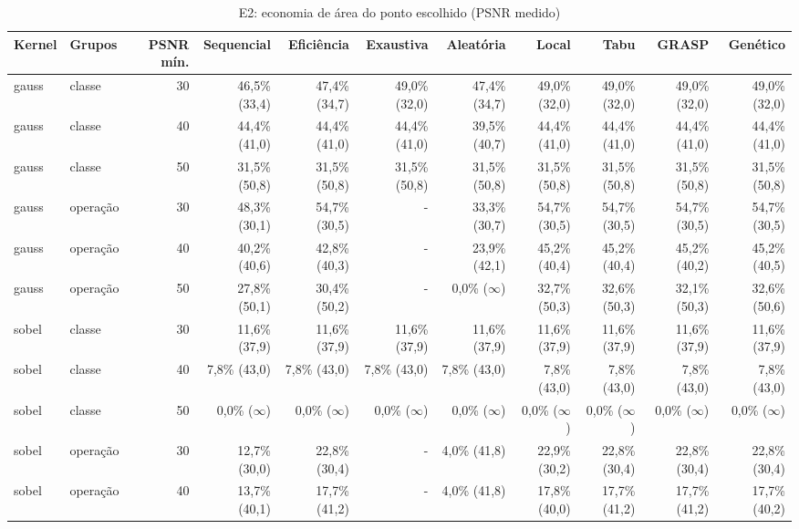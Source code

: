 \begin{table}[htbp]
\centering
\caption{E2: economia de área do ponto escolhido (PSNR medido)}
\begin{tabular}{|l|l|r|r|r|r|r|r|r|r|r|}
\hline
\rowcolor{tabAzul}\color{white}Kernel & \color{white}Grupos & \color{white}PSNR mín. & \color{white}Sequencial & \color{white}Eficiência & \color{white}Exaustiva & \color{white}Aleatória & \color{white}Local & \color{white}Tabu & \color{white}GRASP & \color{white}Genético \\
\hline
gauss & classe & 30 & 46,5\% (33,4) & 47,4\% (34,7) & 49,0\% (32,0) & 47,4\% (34,7) & 49,0\% (32,0) & 49,0\% (32,0) & 49,0\% (32,0) & 49,0\% (32,0) \\ \hline
gauss & classe & 40 & 44,4\% (41,0) & 44,4\% (41,0) & 44,4\% (41,0) & 39,5\% (40,7) & 44,4\% (41,0) & 44,4\% (41,0) & 44,4\% (41,0) & 44,4\% (41,0) \\ \hline
gauss & classe & 50 & 31,5\% (50,8) & 31,5\% (50,8) & 31,5\% (50,8) & 31,5\% (50,8) & 31,5\% (50,8) & 31,5\% (50,8) & 31,5\% (50,8) & 31,5\% (50,8) \\ \hline
gauss & operação & 30 & 48,3\% (30,1) & 54,7\% (30,5) & - & 33,3\% (30,7) & 54,7\% (30,5) & 54,7\% (30,5) & 54,7\% (30,5) & 54,7\% (30,5) \\ \hline
gauss & operação & 40 & 40,2\% (40,6) & 42,8\% (40,3) & - & 23,9\% (42,1) & 45,2\% (40,4) & 45,2\% (40,4) & 45,2\% (40,2) & 45,2\% (40,5) \\ \hline
gauss & operação & 50 & 27,8\% (50,1) & 30,4\% (50,2) & - & 0,0\% ($\infty$) & 32,7\% (50,3) & 32,6\% (50,3) & 32,1\% (50,3) & 32,6\% (50,6) \\ \hline
sobel & classe & 30 & 11,6\% (37,9) & 11,6\% (37,9) & 11,6\% (37,9) & 11,6\% (37,9) & 11,6\% (37,9) & 11,6\% (37,9) & 11,6\% (37,9) & 11,6\% (37,9) \\ \hline
sobel & classe & 40 & 7,8\% (43,0) & 7,8\% (43,0) & 7,8\% (43,0) & 7,8\% (43,0) & 7,8\% (43,0) & 7,8\% (43,0) & 7,8\% (43,0) & 7,8\% (43,0) \\ \hline
sobel & classe & 50 & 0,0\% ($\infty$) & 0,0\% ($\infty$) & 0,0\% ($\infty$) & 0,0\% ($\infty$) & 0,0\% ($\infty$) & 0,0\% ($\infty$) & 0,0\% ($\infty$) & 0,0\% ($\infty$) \\ \hline
sobel & operação & 30 & 12,7\% (30,0) & 22,8\% (30,4) & - & 4,0\% (41,8) & 22,9\% (30,2) & 22,8\% (30,4) & 22,8\% (30,4) & 22,8\% (30,4) \\ \hline
sobel & operação & 40 & 13,7\% (40,1) & 17,7\% (41,2) & - & 4,0\% (41,8) & 17,8\% (40,0) & 17,7\% (41,2) & 17,7\% (41,2) & 17,7\% (40,2) \\ \hline

\end{tabular}
\end{table}
